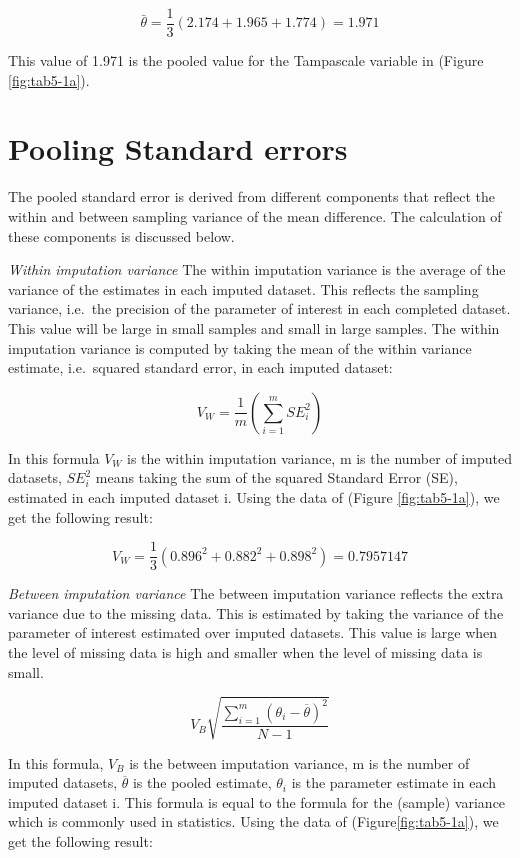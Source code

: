 \documentclass[]{book}
\theoremstyle{definition}
\theoremstyle{definition}
\theoremstyle{definition}
\theoremstyle{remark}
\begin{document}
\[\bar{\theta} = \frac{1}{3}(2.174 + 1.965+1.774)=1.971\]

This value of 1.971 is the pooled value for the Tampascale variable in
(Figure \ref{fig:tab5-1a}).

\section{Pooling Standard errors}\label{pooling-standard-errors}

The pooled standard error is derived from different components that
reflect the within and between sampling variance of the mean difference.
The calculation of these components is discussed below.

\emph{Within imputation variance} The within imputation variance is the
average of the variance of the estimates in each imputed dataset. This
reflects the sampling variance, i.e.~the precision of the parameter of
interest in each completed dataset. This value will be large in small
samples and small in large samples. The within imputation variance is
computed by taking the mean of the within variance estimate,
i.e.~squared standard error, in each imputed dataset:

\begin{equation}
V_W = \frac{1}{m}\left (\sum_{i=1}^m{SE_i^2}\right )
  \label{eq:var-w}
\end{equation}

In this formula \(V_W\) is the within imputation variance, m is the
number of imputed datasets, \(SE_i^2\) means taking the sum of the
squared Standard Error (SE), estimated in each imputed dataset i. Using
the data of (Figure \ref{fig:tab5-1a}), we get the following result:

\[V_W = \frac{1}{3}(0.896^2 + 0.882^2 + 0.898^2)=0.7957147\]

\emph{Between imputation variance} The between imputation variance
reflects the extra variance due to the missing data. This is estimated
by taking the variance of the parameter of interest estimated over
imputed datasets. This value is large when the level of missing data is
high and smaller when the level of missing data is small.

\begin{equation}
V_B\sqrt{\frac{\sum_{i=1}^m (\theta_i - \overline{\theta})^2}{N-1} }
  \label{eq:var-b}
\end{equation}

In this formula, \(V_B\) is the between imputation variance, m is the
number of imputed datasets, \(\overline{\theta}\) is the pooled
estimate, \(\theta_i\) is the parameter estimate in each imputed dataset
i. This formula is equal to the formula for the (sample) variance which
is commonly used in statistics. Using the data of
(Figure\ref{fig:tab5-1a}), we get the following result:
\end{document}
